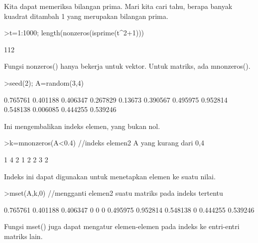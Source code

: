 \documentclass[a4paper,10pt]{article}
\begin{document}
\begin{eulernotebook}
\begin{eulercomment}
\begin{eulercomment}
\begin{eulercomment}
\begin{eulercomment}
\begin{eulercomment}
Kita dapat memeriksa bilangan prima. Mari kita cari tahu, berapa
banyak kuadrat ditambah 1 yang merupakan bilangan prima.
\end{eulercomment}
\begin{eulerprompt}
>t=1:1000; length(nonzeros(isprime(t^2+1)))
\end{eulerprompt}
\begin{euleroutput}
  112
\end{euleroutput}
\begin{eulercomment}
Fungsi nonzeros() hanya bekerja untuk vektor. Untuk matriks, ada
mnonzeros().
\end{eulercomment}
\begin{eulerprompt}
>seed(2); A=random(3,4)
\end{eulerprompt}
\begin{euleroutput}
       0.765761      0.401188      0.406347      0.267829 
        0.13673      0.390567      0.495975      0.952814 
       0.548138      0.006085      0.444255      0.539246 
\end{euleroutput}
\begin{eulercomment}
Ini mengembalikan indeks elemen, yang bukan nol.
\end{eulercomment}
\begin{eulerprompt}
>k=mnonzeros(A<0.4) //indeks elemen2 A yang kurang dari 0,4
\end{eulerprompt}
\begin{euleroutput}
              1             4 
              2             1 
              2             2 
              3             2 
\end{euleroutput}
\begin{eulercomment}
Indeks ini dapat digunakan untuk menetapkan elemen ke suatu nilai.
\end{eulercomment}
\begin{eulerprompt}
>mset(A,k,0) //mengganti elemen2 suatu matriks pada indeks tertentu
\end{eulerprompt}
\begin{euleroutput}
       0.765761      0.401188      0.406347             0 
              0             0      0.495975      0.952814 
       0.548138             0      0.444255      0.539246 
\end{euleroutput}
\begin{eulercomment}
Fungsi mset() juga dapat mengatur elemen-elemen pada indeks ke
entri-entri matriks lain.
\end{eulercomment}
\begin{eulerprompt}

\end{eulerprompt}
\end{eulercomment}
\end{eulercomment}
\end{eulercomment}
\end{eulercomment}
\end{eulernotebook}
\end{document}
